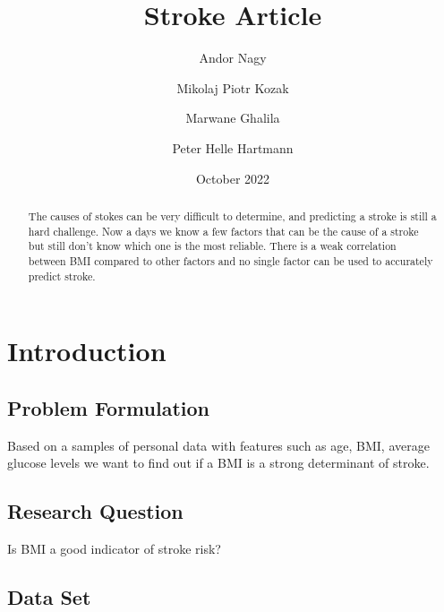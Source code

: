 \documentclass{article}
\title{Stroke Article}
\author{
  {Andor Nagy}
  \and
  {Mikolaj Piotr Kozak}
  \and
  {Marwane Ghalila}
  \and
  {Peter Helle Hartmann}
}
\date{October 2022}
\begin{document}
        \maketitle
        \begin{abstract}
        The causes of stokes can be very difficult to determine, and predicting a stroke is still a hard challenge. Now a days we know a few factors that can be the cause of a stroke but still don't know which one is the most reliable. There is a weak correlation between BMI compared to other factors and no single factor can be used to accurately predict stroke.
        \end{abstract}

\maketitle

\section{Introduction\label{sec:Introduction}}

\subsection{Problem Formulation}
\label{sec:Problem Formulation}
Based on a samples of personal data with features such as age, BMI, average glucose levels we want to find out if a BMI is a strong determinant of stroke.

\subsection{Research Question}
\label{sec:Research Question}
Is BMI a good indicator of stroke risk?
\subsection{Data Set}
\label{sec:Data Set}
\end{document}
